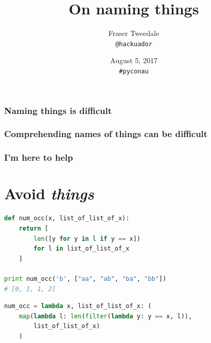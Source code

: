 \documentclass[ignorenonframetext,aspectratio=169]{beamer}
\title{\textbf{On naming things}}
\author{Fraser Tweedale\\\texttt{@hackuador}}
\date{August 5, 2017\\{\tt \#pyconau}}
\begin{document}
\frame[plain]{\titlepage}

\section{Naming things is difficult}

\section{Comprehending names of things can be difficult}

\section{I'm here to help}

\part{Avoid {\em things}}

\begin{frame}[plain]
\centering
{}
\end{frame}

\begin{frame}[fragile]
\begin{lstlisting}[language=Python]
def num_occ(x, list_of_list_of_x):
    return [
        len([y for y in l if y == x])
        for l in list_of_list_of_x
    ]

print num_occ('b', ["aa", "ab", "ba", "bb"])
# [0, 1, 1, 2]
\end{lstlisting}
\end{frame}

\begin{frame}[fragile]
\begin{lstlisting}[language=Python]
num_occ = lambda x, list_of_list_of_x: (
    map(lambda l: len(filter(lambda y: y == x, l)),
        list_of_list_of_x)
    )
\end{lstlisting}
\end{frame}
\end{document}
